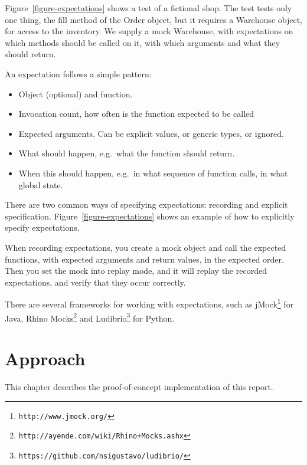 \documentclass[a4paper,11pt]{kth-mag}
\begin{document}
Figure~\ref{figure-expectations} shows a test of a fictional shop. The test
tests only one thing, the fill method of the Order object, but it requires a
Warehouse object, for access to the inventory. We supply a mock Warehouse, with
expectations on which methods should be called on it, with which arguments and
what they should return.

An expectation follows a simple pattern:

\begin{itemize}
	\item Object (optional) and function.
	\item Invocation count, how often is the function expected to be called
	\item Expected arguments. Can be explicit values, or generic types, or
		ignored.
	\item What should happen, e.g.\ what the function should return.
	\item When this should happen, e.g.\ in what sequence of function calls, in
		what global state.
\end{itemize}

There are two common ways of specifying expectations: recording and explicit
specification. Figure~\ref{figure-expectations} shows an example of how to
explicitly specify expectations.

When recording expectations, you create a mock object and call the expected
functions, with expected arguments and return values, in the expected order.
Then you set the mock into replay mode, and it will replay the recorded
expectations, and verify that they occur correctly.

There are several frameworks for working with expectations, such as
jMock\footnote{\texttt{http://www.jmock.org/}} for Java, Rhino
Mocks\footnote{\texttt{http://ayende.com/wiki/Rhino+Mocks.ashx}} and
Ludibrio\footnote{\texttt{https://github.com/nsigustavo/ludibrio/}} for Python.






\pagestyle{newchap}
\chapter{Approach} \label{chapter-approach}

This chapter describes the proof-of-concept implementation of this report.
\end{document}
